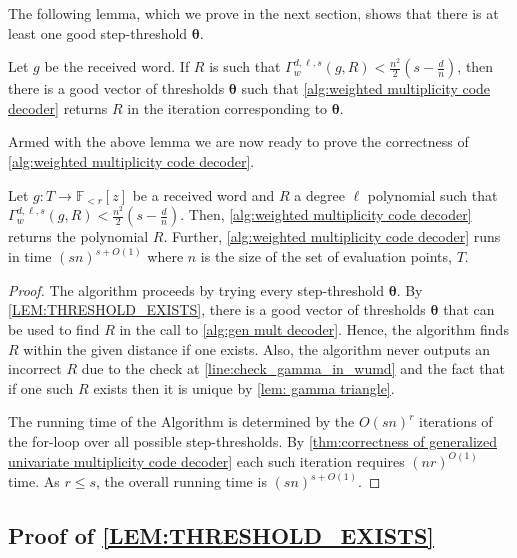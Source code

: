 \documentclass{theoretics}
\def\Field{\mathbb{F}}
\let\F\Field
\newcommand{\thetabar}{{\boldsymbol{\theta}}}
\begin{document}
	The following lemma, which we prove in the next section, shows that there is at least one good step-threshold $\thetabar$.
	
	\begin{lemma} \label{LEM:THRESHOLD_EXISTS}
		Let $g$ be the received word. If $R$ is such that $\Gamma_w^{d, \ell, s}(g, R) < \frac{n^2}{2}(s-\frac{d}{n})$, then there is a good vector of thresholds $\thetabar$ such that \cref{alg:weighted multiplicity code decoder} returns $R$ in the iteration corresponding to $\thetabar$.
	\end{lemma}
	
	Armed with the above lemma we are now ready to prove the correctness of \cref{alg:weighted multiplicity code decoder}.
	
	\begin{theorem} \label{thm: correctness of wumd}
		Let $g\colon T \to \F_{<r}[z]$ be a received word and $R$ a degree $\ell$ polynomial such that $\Gamma_w^{d, \ell, s}(g, R) < \frac{n^2}{2}(s-\frac{d}{n})$. Then, \cref{alg:weighted multiplicity code decoder} returns the polynomial $R$. Further, \cref{alg:weighted multiplicity code decoder} runs in time $(sn)^{s + O(1)}$ where $n$ is the size of the set of evaluation points, $T$. 
	\end{theorem}
	
	\begin{proof}
		The algorithm proceeds by trying every step-threshold $\thetabar$. By \cref{LEM:THRESHOLD_EXISTS}, there is a good vector of thresholds $\thetabar$ that can be used to find $R$ in the call to \cref{alg:gen mult decoder}. Hence, the algorithm finds $R$ within the given distance if one exists. Also, the algorithm never outputs an incorrect $R$ due to the check at \cref{line:check_gamma_in_wumd} and the fact that if one such $R$ exists then it is unique by \cref{lem: gamma triangle}.
		
		The running time of the Algorithm is determined by the $O(sn)^r$ iterations of the for-loop over all possible step-thresholds. By \cref{thm:correctness of generalized univariate multiplicity code decoder}  each such iteration requires $(nr)^{O(1)}$ time. As $r\leq s$, the overall running time is $(sn)^{s+O(1)}$.
	\end{proof}
	
	\subsection{Proof of \texorpdfstring{\cref{LEM:THRESHOLD_EXISTS}}{Lemma 6.5}}
	
\end{document}
